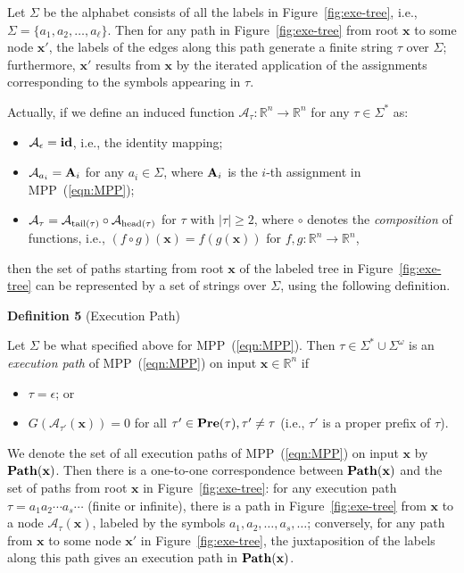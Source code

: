 \documentclass{article}
\newcommand{\head}{{\rm head}}
\newcommand{\tail}{{\rm tail}}
\newcommand{\A}{\mathcal{A}}
\newcommand{\xx}{\mathbf{x}}
\begin{document}
Let $\Sigma$ be the alphabet consists of all the labels in Figure~\ref{fig:exe-tree}, i.e., $\Sigma=\{a_1,a_2,\ldots,a_{\ell}\}$. Then for any path in Figure~\ref{fig:exe-tree} from root $\xx$ to some node $\xx'$, the labels of the edges along this path generate a finite string $\tau$ over $\Sigma$; furthermore, $\xx'$ results from $\xx$ by the iterated application of the assignments corresponding to the symbols appearing in $\tau$.

Actually, if we define an induced function $\A_{\tau}: \mathbb{R}^n \rightarrow \mathbb{R}^n$ for any $\tau\in \Sigma^*$ as:
\begin{itemize}
\item $\A_{\epsilon}={\bf id}$, i.e., the identity mapping;
\item $\A_{a_i}={\bf A}_i$ for any $a_i\in \Sigma$, where ${\bf A}_i$ is the $i$-th assignment in MPP~(\ref{eqn:MPP});
\item $\A_{\tau} = \A_{\tail(\tau)} \circ \A_{\head(\tau)}$ for $\tau$ with $|\tau|\geq 2$, where $\circ$ denotes the \emph{composition} of functions, i.e., $(f \circ g)(\xx)=f(g(\xx))$ for $f,g: \mathbb{R}^n \rightarrow \mathbb{R}^n$,
\end{itemize}
then the set of paths starting from root $\xx$ of the labeled tree in Figure~\ref{fig:exe-tree} can be represented by a set of strings over $\Sigma$, using the following definition.

{\bf Definition 5} (Execution Path)~~{Let $\Sigma$ be what specified above for MPP~(\ref{eqn:MPP}). Then $\tau \in \Sigma^* \cup \Sigma^{\omega}$ is an \emph{execution path} of MPP~(\ref{eqn:MPP}) on input $\xx \in \mathbb{R}^n$ if
\begin{itemize}
\item $\tau=\epsilon$; or
\item $G(\A_{\tau'}(\xx))=0$ for all $\tau' \in {\bf Pre}(\tau), \tau' \neq \tau$ (i.e., $\tau'$ is a proper prefix of $\tau$).
\end{itemize}}

We denote the set of all execution paths of MPP~(\ref{eqn:MPP}) on input $\xx$ by ${\bf Path}(\xx)$. Then there is a one-to-one correspondence between ${\bf Path}(\xx)$ and the set of paths from root $\xx$ in Figure~\ref{fig:exe-tree}: for any execution path $\tau=a_1a_2 \cdots a_s \cdots$ (finite or infinite), there is a path in Figure~\ref{fig:exe-tree} from $\xx$ to a node $\A_{\tau}(\xx)$,  labeled by the symbols $a_1,a_2,\ldots,a_s,\ldots$; conversely, for any path from $\xx$ to some node $\xx'$ in Figure~\ref{fig:exe-tree}, the juxtaposition of the labels along this path gives an execution path in ${\bf Path}(\xx)$.
\end{document}
